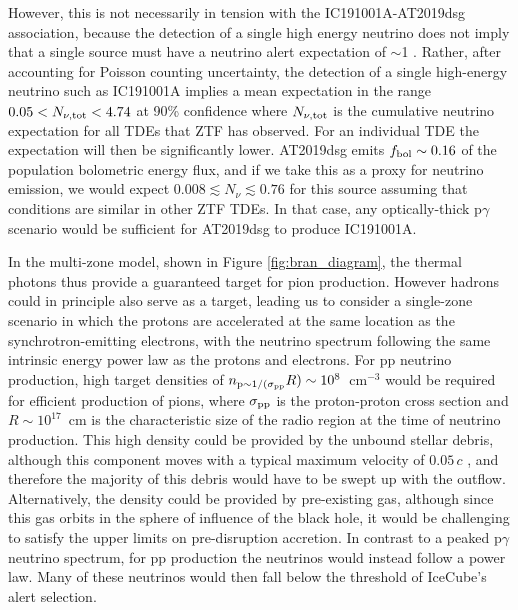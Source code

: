 However, this is not necessarily in tension with the IC191001A-AT2019dsg association, because the detection of a single high energy neutrino does not imply that a  single source must have a neutrino alert expectation of $\sim$1 . Rather, after accounting for Poisson counting uncertainty, the detection of a single high-energy neutrino such as IC191001A implies a mean expectation in the range $0.05 < N_{\nu, \textup{tot}} < 4.74$ at 90\% confidence where $N_{\nu, \textup{tot}}$ is the cumulative neutrino expectation for all TDEs that ZTF has observed. For an individual TDE the expectation will then be significantly lower. AT2019dsg emits $f_{\textup{bol}} \sim 0.16$ of the population bolometric energy flux, and if we take this as a proxy for neutrino emission, we would expect $0.008 \lesssim N_{\nu} \lesssim 0.76$ for this source assuming that conditions are similar in other ZTF TDEs. In that case, any optically-thick p$\gamma$ scenario would be sufficient for AT2019dsg to produce IC191001A. 

In the multi-zone model, shown in Figure \ref{fig:bran_diagram}, the thermal photons thus provide a guaranteed target for pion production. However hadrons could in principle also serve as a target, leading us to consider a single-zone scenario in which the protons are accelerated at the same location as the synchrotron-emitting electrons, with the neutrino spectrum following the same intrinsic energy power law as the protons and electrons. For pp neutrino production, high target densities of $n_{\textup{p}\sim 1/(\sigma_{\textup{pp}}} R)\sim 10^8$~cm$^{-3}$ would be required for efficient production of pions, where $\sigma_{\textup{pp}}$ is the proton-proton cross section and $R \sim 10^{17}$~cm is the characteristic size of the radio region at the time of neutrino production. This high density could be provided by the unbound stellar debris, although this component moves with a typical maximum velocity of $0.05\,c$  , and therefore the majority of this debris would have to be swept up with the outflow. Alternatively, the density could be provided by pre-existing gas, although since this gas orbits in the sphere of influence of the black hole, it would be challenging to satisfy the upper limits on pre-disruption accretion. In contrast to a peaked p$\gamma$ neutrino spectrum, for pp production the neutrinos would instead follow a power law. Many of these neutrinos would then fall below the threshold of IceCube's alert selection. 

